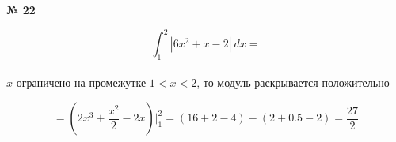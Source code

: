 \documentclass{article}
\begin{document}
\textbf{№ 22} 
\large

$$ \int_{1}^{2} \left| 6x^2+x-2 \right| \ dx 
= $$
\\
$x$ ограничено на промежутке $ 1<x<2 $, то модуль раскрывается положительно

$$ = \left( 2x^3+\frac{x^2}{2}-2x \right) \bigg\vert_{1}^{2}
= \left( 16+2-4\right) - \left( 2+0.5-2 \right)
= \frac{27}{2}$$
\end{document}
